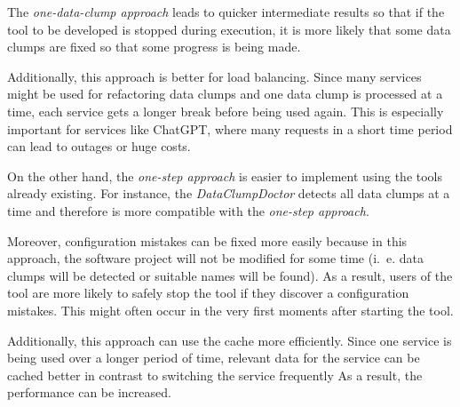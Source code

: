 The \textit{one-data-clump approach} leads to quicker intermediate results so that if the tool to be developed is stopped during execution, it is more likely that some data clumps are fixed so that some progress is being made.

Additionally, this approach is better for load balancing. Since many services might be used for refactoring data clumps and one data clump is processed at a time, each service gets a longer break before being used again. This is  especially important for services like ChatGPT, where many requests in a short time period can lead to outages or huge costs. 

On the other hand, the \textit{one-step approach} is easier to implement using the tools already existing. For instance, the \textit{DataClumpDoctor} detects all data clumps at a time and therefore is more compatible with the \textit{one-step approach}.

Moreover, configuration mistakes can be fixed more easily because in this approach, the software project will not be modified for some time (i.~e. data clumps will be detected or suitable names will be found). As a result, users of the tool are more likely to safely stop the tool if they discover a configuration mistakes. This might often occur in the very first moments after starting the tool.

Additionally, this approach can use the cache more efficiently. Since one service is being used  over a longer period of time,  relevant data for the service can be cached better in contrast to switching the service frequently  As a result, the performance can be increased. 